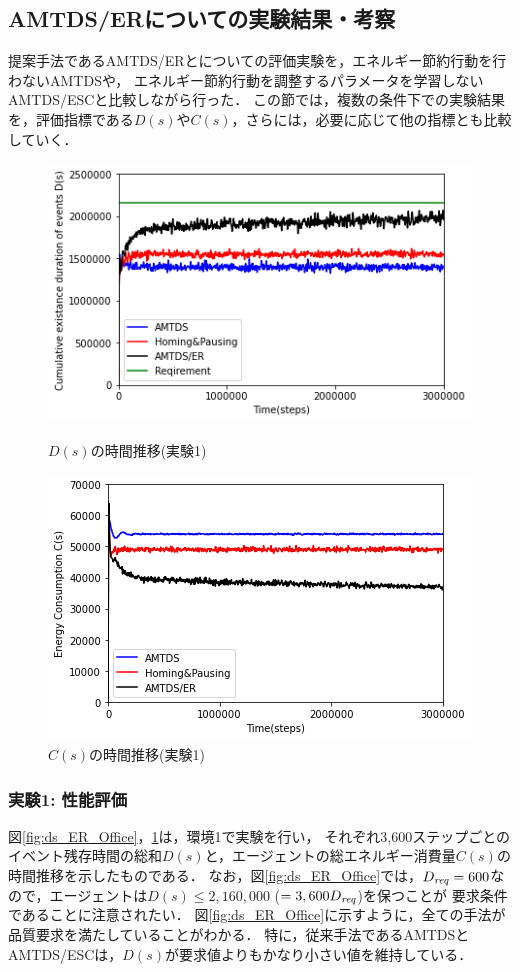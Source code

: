 \documentclass[12pt,a4j,twoside]{jarticle}
\def\Dreq{{D_{\it req}}}
\begin{document}
  \subsection{AMTDS/ERについての実験結果・考察}\label{result_ER}
  提案手法であるAMTDS/ERとについての評価実験を，エネルギー節約行動を行わないAMTDSや，
  エネルギー節約行動を調整するパラメータを学習しないAMTDS/ESCと比較しながら行った．
  この節では，複数の条件下での実験結果を，評価指標である$D(s)$や$C(s)$，さらには，必要に応じて他の指標とも比較していく．

  
  \begin{figure}
    \centering
    \includegraphics[width=0.9\hsize]{figures/ds_graph_3600_ave_ER_Office_600.png}
    \caption{$D(s)$の時間推移(実験1)}
    \label{fig:ds_ER_Office}
    \vspace{12pt}
    \centering
    \includegraphics[width=0.9\hsize]{figures/cs_graph_3600_ave_ER_Office_600.png}
    \caption{$C(s)$の時間推移(実験1)}
    \label{fig:cs_ER_Office}
  \end{figure}
  

  \subsubsection{実験1: 性能評価}\label{ex:ER1}
  図\ref{fig:ds_ER_Office}，\ref{fig:cs_ER_Office}は，環境1で実験を行い，
  それぞれ3,600ステップごとのイベント残存時間の総和$D(s)$と，エージェントの総エネルギー消費量$C(s)$の時間推移を示したものである．
  なお，図\ref{fig:ds_ER_Office}では，$\Dreq=600$なので，エージェントは$D(s)\leq 2,160,000$ ($=3,600\Dreq$)を保つことが
  要求条件であることに注意されたい．
  図\ref{fig:ds_ER_Office}に示すように，全ての手法が品質要求を満たしていることがわかる．
  特に，従来手法であるAMTDSとAMTDS/ESCは，$D(s)$が要求値よりもかなり小さい値を維持している．
  \par
\end{document}
